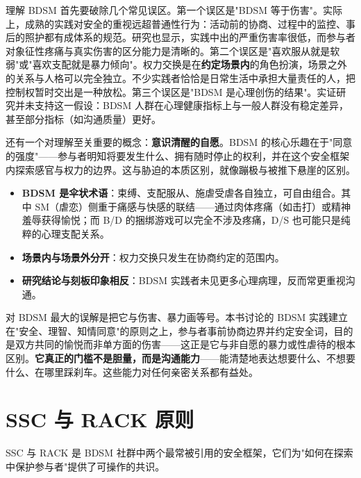 \documentclass[12pt,UTF8]{ctexbook}
\newcommand{\keyword}[1]{\textbf{#1}}
\begin{document}
理解 BDSM 首先要破除几个常见误区。第一个误区是"BDSM 等于伤害"。实际上，成熟的实践对安全的重视远超普通性行为：活动前的协商、过程中的监控、事后的照护都有成体系的规范。研究也显示，实践中出的严重伤害率很低，而参与者对象征性疼痛与真实伤害的区分能力是清晰的。第二个误区是"喜欢服从就是软弱"或"喜欢支配就是暴力倾向"。权力交换是在\keyword{约定场景内}的角色扮演，场景之外的关系与人格可以完全独立。不少实践者恰恰是日常生活中承担大量责任的人，把控制权暂时交出是一种放松。第三个误区是"BDSM 是心理创伤的结果"。实证研究并未支持这一假设：BDSM 人群在心理健康指标上与一般人群没有稳定差异，甚至部分指标（如沟通质量）更好。

还有一个对理解至关重要的概念：\keyword{意识清醒的自愿}。BDSM 的核心乐趣在于"同意的强度"——参与者明知将要发生什么、拥有随时停止的权利，并在这个安全框架内探索感官与权力的边界。这与胁迫的本质区别，就像蹦极与被推下悬崖的区别。

\begin{itemize}
  \item \keyword{BDSM 是伞状术语}：束缚、支配服从、施虐受虐各自独立，可自由组合。其中 SM（虐恋）侧重于痛感与快感的联结——通过肉体疼痛（如击打）或精神羞辱获得愉悦；而 B/D 的捆绑游戏可以完全不涉及疼痛，D/S 也可能只是纯粹的心理支配关系。
  \item \keyword{场景内与场景外分开}：权力交换只发生在协商约定的范围内。
  \item \keyword{研究结论与刻板印象相反}：BDSM 实践者未见更多心理病理，反而常更重视沟通\citep{wismeijer2013,richters2008}。
\end{itemize}

\begin{tcolorbox}[colback=pink!5!white,colframe=red!50!black,title=贴心小叮咛]
对 BDSM 最大的误解是把它与伤害、暴力画等号。本书讨论的 BDSM 实践建立在"安全、理智、知情同意"的原则之上，参与者事前协商边界并约定安全词，目的是双方共同的愉悦而非单方面的伤害——这正是它与非自愿的暴力或性虐待的根本区别。\keyword{它真正的门槛不是胆量，而是沟通能力}——能清楚地表达想要什么、不想要什么、在哪里踩刹车。这些能力对任何亲密关系都有益处。
\end{tcolorbox}
\section{SSC 与 RACK 原则}

SSC 与 RACK 是 BDSM 社群中两个最常被引用的安全框架，它们为"如何在探索中保护参与者"提供了可操作的共识。
\end{document}
